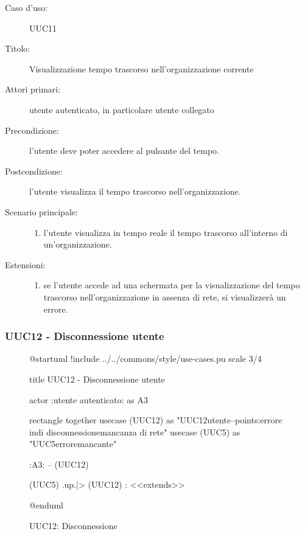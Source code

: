 \documentclass[casi-duso]{subfiles}
\begin{document}
\begin{description}
  \item[Caso d’uso:] UUC11
  \item[Titolo:] Visualizzazione tempo trascorso nell'organizzazione corrente
  \item[Attori primari:] utente autenticato, in particolare utente collegato
  \item[Precondizione:] l'utente deve poter accedere al pulsante del tempo.
  \item[Postcondizione:] l'utente visualizza il tempo trascorso nell'organizzazione.
  \item[Scenario principale:]
        \begin{enumerate}
          \item l'utente visualizza in tempo reale il tempo trascorso all'interno di un'organizzazione.
        \end{enumerate}
  \item[Estensioni:]
        \begin{enumerate}
          \item se l'utente accede ad una schermata per la visualizzazione del tempo trascorso nell'organizzazione in assenza di rete, si visualizzerà un errore.
        \end{enumerate}
\end{description}

\subsubsection{UUC12 - Disconnessione utente}%
\label{subsub:UUC12utente}

\begin{figure}[h!] 
  \centering 
  \begin{plantuml}
  @startuml
  !include ../../commons/style/use-cases.pu
  scale 3/4

  title UUC12 - Disconnessione utente

  actor :utente autenticato: as A3

  rectangle {
    together {
      usecase (UUC12) as "UUC12\nDisconnessione utente\n--\nExtension points:\nVisualizzazione errore in\ncaso di disconnessione\nin mancanza di rete"
      usecase (UUC5) as "UUC5\nVisualizzazione errore\nrete mancante"
    }
  }

  :A3: -- (UUC12)

  (UUC5) .up.|> (UUC12) : <<extends>>

  @enduml
  \end{plantuml} 
  \caption{UUC12: Disconnessione} 
  \label{fig:uuc12} 
\end{figure}
\end{document}
